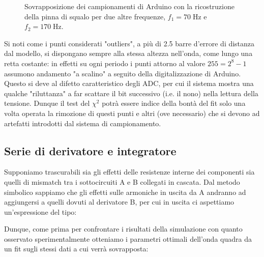 \documentclass{article}[a4paper, oneside ,11pt]
\begin{document}
\begin{figure}[!htb]
	\scalebox{0.55}{}\hfill \scalebox{0.55}{}
 	\caption{Sovrapposizione dei campionamenti di Arduino con la ricostruzione della pinna di squalo per due altre frequenze, $f_1 = 70 \; \si{\hertz}$ e $f_2 = 170 \; \si{\hertz}$. \label{plt:fins}}
\end{figure}
Si noti come i punti considerati "outliers", a più di 2.5 barre d'errore di distanza dal modello, si dispongano sempre alla stessa altezza nell'onda, come lungo una retta costante: in effetti su ogni periodo i punti attorno al valore $255 = 2^8 -1$ assumono andamento "a scalino" a seguito della digitalizzazione di Arduino. Questo si deve al difetto caratteristico degli ADC, per cui il sistema mostra una qualche "riluttanza" a far scattare il bit successivo (i.e. il nono) nella lettura della tensione. Dunque il test del $\chi^2$ potrà essere indice della bontà del fit solo una volta operata la rimozione di questi punti e altri (ove necessario) che si devono ad artefatti introdotti dal sistema di campionamento.
\subsection{Serie di derivatore e integratore}
Supponiamo trascurabili sia gli effetti delle resistenze interne dei componenti sia quelli di mismatch tra i sottocircuiti A e B collegati in cascata. Dal metodo simbolico sappiamo che gli effetti sulle armoniche in uscita da A andranno ad aggiungersi a quelli dovuti al derivatore B, per cui in uscita ci aspettiamo un'espressione del tipo:

Dunque, come prima per confrontare i risultati della simulazione con quanto osservato sperimentalmente otteniamo i parametri ottimali dell'onda quadra da un fit sugli stessi dati a cui verrà sovrapposta:\\

\end{document}
